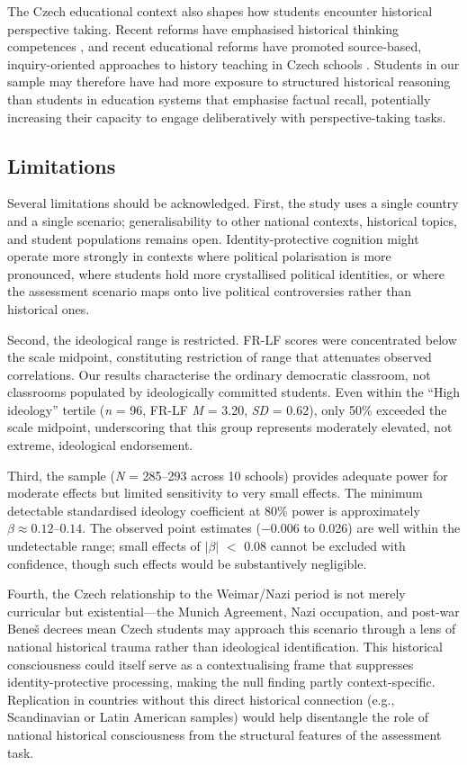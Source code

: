 \documentclass[referee,pdflatex,sn-apa]{sn-jnl}
\begin{document}
The Czech educational context also shapes how students encounter historical perspective taking. Recent reforms have emphasised historical thinking competences \citep{Cinatl2021,Munich2023}, and recent educational reforms have promoted source-based, inquiry-oriented approaches to history teaching in Czech schools \citep{Ripka2024}. Students in our sample may therefore have had more exposure to structured historical reasoning than students in education systems that emphasise factual recall, potentially increasing their capacity to engage deliberatively with perspective-taking tasks.

\subsection{Limitations}\label{subsec:limitations}

Several limitations should be acknowledged. First, the study uses a single country and a single scenario; generalisability to other national contexts, historical topics, and student populations remains open. Identity-protective cognition might operate more strongly in contexts where political polarisation is more pronounced, where students hold more crystallised political identities, or where the assessment scenario maps onto live political controversies rather than historical ones.

Second, the ideological range is restricted. FR-LF scores were concentrated below the scale midpoint, constituting restriction of range that attenuates observed correlations. Our results characterise the ordinary democratic classroom, not classrooms populated by ideologically committed students. Even within the ``High ideology'' tertile (\textit{n} = 96, FR-LF \textit{M} = 3.20, \textit{SD} = 0.62), only 50\% exceeded the scale midpoint, underscoring that this group represents moderately elevated, not extreme, ideological endorsement.

Third, the sample (\textit{N} = 285--293 across 10 schools) provides adequate power for moderate effects but limited sensitivity to very small effects. The minimum detectable standardised ideology coefficient at 80\% power is approximately $\beta \approx 0.12$--$0.14$. The observed point estimates ($-$0.006 to 0.026) are well within the undetectable range; small effects of $|\beta|$ $<$ 0.08 cannot be excluded with confidence, though such effects would be substantively negligible.

Fourth, the Czech relationship to the Weimar/Nazi period is not merely curricular but existential---the Munich Agreement, Nazi occupation, and post-war Bene\v{s} decrees mean Czech students may approach this scenario through a lens of national historical trauma rather than ideological identification. This historical consciousness could itself serve as a contextualising frame that suppresses identity-protective processing, making the null finding partly context-specific. Replication in countries without this direct historical connection (e.g., Scandinavian or Latin American samples) would help disentangle the role of national historical consciousness from the structural features of the assessment task.
\end{document}

